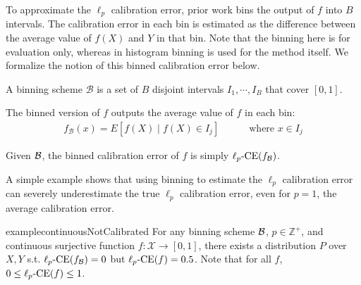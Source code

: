 To approximate the $\ell_p$ calibration error, prior work bins the output of $f$ into $B$ intervals.
The calibration error in each bin is estimated as the difference between the average value of $f(X)$ and $Y$ in that bin.
Note that the binning here is for evaluation only, whereas in histogram binning is used for the method itself.
We formalize the notion of this binned calibration error below.

\begin{definition}
A binning scheme $\mathcal{B}$ is a set of $B$ disjoint intervals $I_1, \cdots, I_B$ that cover $[0, 1]$.
\end{definition}

\begin{definition}
The binned version of $f$ outputs the average value of $f$ in each bin:
\begin{align}
f_{\mathcal{B}}(x) = E[f(X) \mid f(X) \in I_j] \quad\quad\quad \mbox{where }x \in I_j
\end{align} 
\end{definition}

\begin{definition}
Given $\mathcal{B}{}$, the binned calibration error of $f$ is simply $\ell_p\mbox{-CE}(f_{\mathcal{B}{}})$.
\end{definition}


A simple example shows that using binning to estimate the $\ell_p$ calibration error can severely underestimate the true $\ell_p$ calibration error, even for $p=1$, the average calibration error.

\begin{restatable}{example}{continuousNotCalibrated}
\label{ex:continuous-not-calibrated}
For any binning scheme $\mathcal{B}{}$, $p \in \mathbb{Z}^+$, and continuous surjective function $f : \mathcal{X} \to [0, 1]$, there exists a distribution $P$ over $X, Y$ s.t. $\ell_p\mbox{-CE}(f_{\mathcal{B}{}}) = 0$ but $\ell_p\mbox{-CE}(f) = 0.5$.
Note that for all $f$, $0 \leq \ell_p\mbox{-CE}(f) \leq 1$.
\end{restatable}

